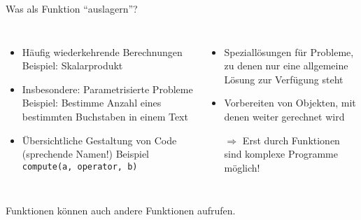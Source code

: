 \begin{frame}{Was als Funktion \enquote{auslagern}?}
%
\begin{columns}
\begin{itemize}
\item Häufig wiederkehrende Berechnungen\newline
	Beispiel: Skalarprodukt
\item Insbesondere: Parametrisierte Probleme\newline
	Beispiel: Bestimme Anzahl eines bestimmten Buchstaben in einem Text
\item Übersichtliche Gestaltung von Code (sprechende Namen!)\newline
	Beispiel \texttt{compute(a, operator, b)}
\end{itemize}
%
\begin{itemize}
\item Speziallösungen für Probleme, zu denen nur eine allgemeine Lösung zur Verfügung steht
\item Vorbereiten von Objekten, mit denen weiter gerechnet wird
\item[$\Rightarrow$] Erst durch Funktionen sind komplexe Programme möglich!
\end{itemize}
\end{columns}
%
\begin{hintbox}
Funktionen können auch andere Funktionen aufrufen.
\end{hintbox}
%
\end{frame}

